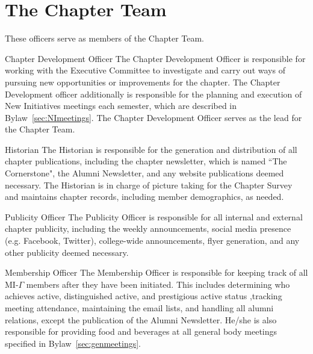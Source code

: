 \section{The Chapter Team}
These officers serve as members of the Chapter Team.
\begin{enumsubsection}
\item{Chapter Development Officer} The Chapter Development Officer is responsible for working with the Executive Committee to investigate and carry out ways of pursuing new opportunities or improvements for the chapter. The Chapter Development officer additionally is responsible for the planning and execution of New Initiatives meetings each semester, which are described in Bylaw~\ref{sec:NImeetings}. The Chapter Development Officer serves as the lead for the Chapter Team.

\item{Historian} The Historian is responsible for the generation and distribution of all chapter publications, including the chapter newsletter, which is named ``The Cornerstone", the Alumni Newsletter, and any website publications deemed necessary. The Historian is in charge of picture taking for the Chapter Survey and maintains chapter records, including member demographics, as needed. 

\item{Publicity Officer} The Publicity Officer is responsible for all internal and external chapter publicity, including the weekly announcements, social media presence (e.g. Facebook, Twitter), college-wide announcements, flyer generation, and any other publicity deemed necessary.

\item{Membership Officer} The Membership Officer is responsible for keeping track of all MI-$\Gamma$ members after they have been initiated. This includes determining who achieves active,  distinguished active, and prestigious active  status ,tracking meeting attendance, maintaining the email lists, and handling all alumni relations, except the publication of the Alumni Newsletter.  He/she is also responsible for providing food and beverages at all general body meetings specified in Bylaw~\ref{sec:genmeetings}.
\end{enumsubsection}
%
